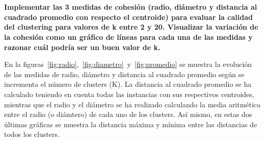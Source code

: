 \documentclass[11pt,a4paper]{article}
\begin{document}
 
\pagestyle{fancy}
\fancyhf{}
\rfoot{\thepage\ / \pageref{LastPage}}
\renewcommand{\headrulewidth}{0.4pt}
\renewcommand{\footrulewidth}{0.4pt}
\section*{}

\textbf{Implementar las 3 medidas de cohesión (radio, diámetro y distancia al
cuadrado promedio con respecto el centroide) para evaluar la calidad del
clustering para valores de k entre 2 y 20. Visualizar la variación de la
cohesión como un gráfico de líneas para cada una de las medidas y razonar
cuál podría ser un buen valor de k.}


En la figuras~\ref{fig:radio},~\ref{fig:diametro}~y~\ref{fig:promedio} se
muestra la evolución de las medidas de radio, diámetro y distancia al
cuadrado promedio según se incrementa el número de clusters (K). La
distancia al cuadrado promedio se ha calculado teniendo en cuenta todas las
instancias con sus respectivos centroides, mientras que el radio y el
diámetro se ha realizado calculando la media aritmética entre el radio (o
diámtero) de cada uno de los clusters. Así mismo, en estas dos últimas
gráficas se muestra la distancia máxima y mínima entre las distancias de
todos los clusters.
\end{document}

